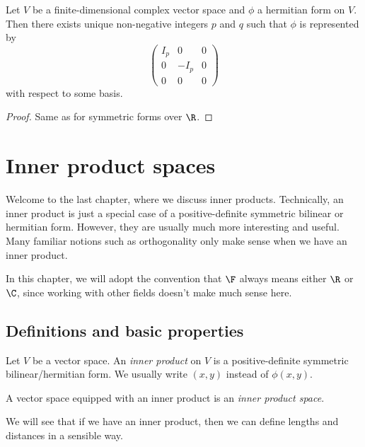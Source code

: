 \documentclass[a4paper]{article}
\begin{document}
\begin{thm}
  Let $V$ be a finite-dimensional complex vector space and $\phi$ a hermitian form on $V$. Then there exists unique non-negative integers $p$ and $q$ such that $\phi$ is represented by
  \[
    \begin{pmatrix}
      I_p & 0 & 0\\
      0 & -I_p & 0\\
      0 & 0 & 0
    \end{pmatrix}
  \]
  with respect to some basis.
\end{thm}

\begin{proof}
  Same as for symmetric forms over $\R$.
\end{proof}

\section{Inner product spaces}
Welcome to the last chapter, where we discuss inner products. Technically, an inner product is just a special case of a positive-definite symmetric bilinear or hermitian form. However, they are usually much more interesting and useful. Many familiar notions such as orthogonality only make sense when we have an inner product.

In this chapter, we will adopt the convention that $\F$ always means either $\R$ or $\C$, since working with other fields doesn't make much sense here.

\subsection{Definitions and basic properties}
\begin{defi}
  Let $V$ be a vector space. An \emph{inner product} on $V$ is a positive-definite symmetric bilinear/hermitian form. We usually write $(x, y)$ instead of $\phi(x, y)$.

  A vector space equipped with an inner product is an \emph{inner product space}.
\end{defi}
We will see that if we have an inner product, then we can define lengths and distances in a sensible way.
\end{document}
